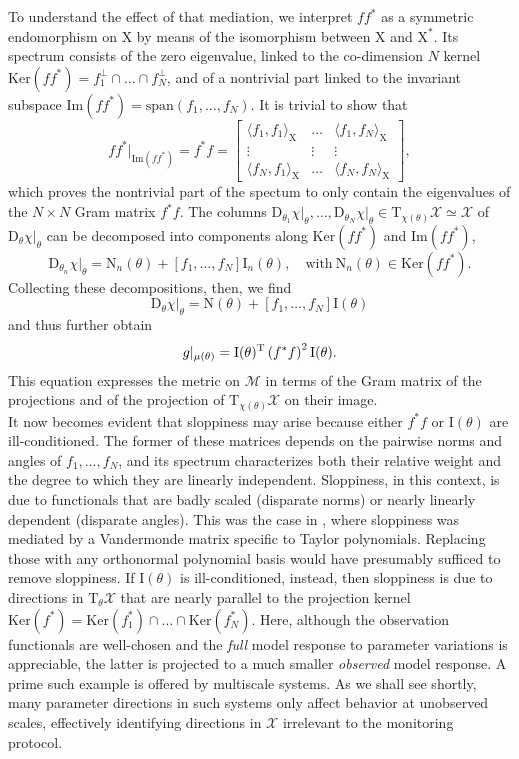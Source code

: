 \documentclass{article}
\newcommand{\D}{\mathrm{D}}
\newcommand{\p}{\theta}
\newcommand{\fmr}{\chi}
\newcommand{\fmm}{\mathcal{X}}
\newcommand{\omr}{\mu}
\newcommand{\omm}{\mathcal{M}}
\newcommand{\fms}{\mathrm{X}}
\newcommand{\be}{\begin{equation}}
\newcommand{\ee}{\end{equation}}
\begin{document}
To understand the effect of that mediation,
we interpret $f f^*$ as a symmetric endomorphism on $\fms$
by means of the isomorphism between $\fms$ and $\fms^*$.
Its spectrum consists of the zero eigenvalue,
linked to the co-dimension $N$ kernel
$\mathrm{Ker}(f f^*) = f_1^\perp \cap \ldots \cap f_N^\perp$,
and of a nontrivial part linked to the invariant subspace
$\mathrm{Im}(f f^*) = \mathrm{span}(f_1,\ldots,f_N)$.
It is trivial to show that
%
\[
 f f^*\vert_{\mathrm{Im}(f f^*)}
=
 f^* f
=
\left[\begin{array}{ccc}
 \langle f_1,f_1\rangle_\fms
&
 \ldots
&
 \langle f_1,f_N\rangle_\fms
\\
 \vdots
&
 \vdots
&
 \vdots
\\
 \langle f_N,f_1\rangle_\fms
&
 \ldots
&
 \langle f_N,f_N\rangle_\fms
\end{array}\right] ,
\]
%
which proves the nontrivial part of the spectum to only contain
the eigenvalues of the $N \times N$ Gram matrix $f^* f$.
The columns
$\D_{\p_1}\fmr\vert_\p , \ldots , \D_{\p_N}\fmr\vert_\p
\in \mathrm{T}_{\fmr(\p)}\fmm \simeq \fmm$
of $\D_\p\fmr\vert_\p$ can be decomposed into components along
$\mathrm{Ker}(f f^*)$ and $\mathrm{Im}(f f^*)$,
%
\[
 \D_{\p_n}\fmr\vert_\p
=
 \mathrm{N}_n(\p)
+
 \left[ f_1 , \ldots , f_N \right]
 \mathrm{I}_n(\p) ,
\quad \mbox{with} \
 \mathrm{N}_n(\p) \in \mathrm{Ker}(f f^*) .
\]
%
Collecting these decompositions, then, we find
%
\[
 \D_\p\fmr\vert_\p
=
 \mathrm{N}(\p)
+
 \left[ f_1 , \ldots , f_N \right]
 \mathrm{I}(\p)
\]
%
and thus further obtain
%
\be
 g\vert_{\omr(\p)}
=
 \mathrm{I}(\p)^{\rm T}
\left(
 f^* f
\right)^2
 \mathrm{I}(\p) .
\label{g-ito-proj}
\ee
%
This equation expresses the metric on $\omm$
in terms of the Gram matrix of the projections
and of the projection of $\mathrm{T}_{\fmr(\p)}\fmm$ on their image.\\

It now becomes evident that sloppiness may arise
because either $f^* f$ or $\mathrm{I}(\p)$ are ill-conditioned.
The former of these matrices depends on
the pairwise norms and angles of $f_1,\ldots,f_N$,
and its spectrum characterizes both their relative weight
and the degree to which they are linearly independent.
Sloppiness, in this context, is due to functionals
that are badly scaled (disparate norms)
or nearly linearly dependent (disparate angles).
This was the case in \cite{WCGBMBES06},
where sloppiness was mediated by a Vandermonde matrix
specific to Taylor polynomials.
Replacing those with any orthonormal polynomial basis
would have presumably sufficed to remove sloppiness.
If $\mathrm{I}(\p)$ is ill-conditioned, instead,
then sloppiness is due to directions in $\mathrm{T}_\p\fmm$
that are nearly parallel to the projection kernel
$\mathrm{Ker}(f^*)
=
\mathrm{Ker}(f^*_1) \cap \ldots \cap \mathrm{Ker}(f^*_N)$.
Here, although the observation functionals are well-chosen
and the \emph{full} model response to parameter variations is appreciable,
the latter is projected to a much smaller \emph{observed} model response.
A prime such example is offered by multiscale systems.
As we shall see shortly,
many parameter directions in such systems
only affect behavior at unobserved scales,
effectively identifying directions in $\fmm$
irrelevant to the monitoring protocol.\\
\end{document}
